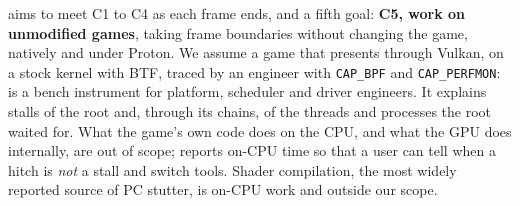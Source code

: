 \sys aims to meet C1 to C4 as each frame ends, and a fifth goal: \textbf{C5,
work on unmodified games}, taking frame boundaries without changing the
game, natively and under Proton. We assume a game that presents through
Vulkan, on a stock kernel with BTF, traced by an engineer with
\texttt{CAP\_BPF} and \texttt{CAP\_PERFMON}: \sys is a bench instrument for
platform, scheduler and driver engineers. It explains stalls of the root
and, through its chains, of the threads and processes the root waited for.
What the game's own code does on the CPU, and what the GPU does internally,
are out of scope; \sys reports on-CPU time so that a user can tell when a
hitch is \emph{not} a stall and switch tools. Shader compilation, the most
widely reported source of PC stutter, is on-CPU work and outside our scope.
